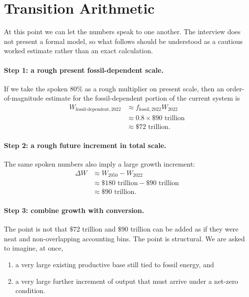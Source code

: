 \section{Transition Arithmetic}

At this point we can let the numbers speak to one another. The interview does not present a formal model, so what follows should be understood as a cautious worked estimate rather than an exact calculation.

\paragraph{Step 1: a rough present fossil-dependent scale.}

If we take the spoken \(80\%\) as a rough multiplier on present scale, then an order-of-magnitude estimate for the fossil-dependent portion of the current system is
\begin{align}
W_{\mathrm{fossil\text{-}dependent},2022}
&\approx f_{\mathrm{fossil},2022}W_{2022}\\
&\approx 0.8 \times \$90\text{ trillion}\\
&\approx \$72\text{ trillion}.
\end{align}

\paragraph{Step 2: a rough future increment in total scale.}

The same spoken numbers also imply a large growth increment:
\begin{align}
\Delta W
&\approx W_{2050} - W_{2022}\\
&\approx \$180\text{ trillion} - \$90\text{ trillion}\\
&\approx \$90\text{ trillion}.
\end{align}

\paragraph{Step 3: combine growth with conversion.}

The point is not that \(\$72\) trillion and \(\$90\) trillion can be added as if they were neat and non-overlapping accounting bins. The point is structural. We are asked to imagine, at once,
\begin{enumerate}
\item a very large existing productive base still tied to fossil energy, and
\item a very large further increment of output that must arrive under a net-zero condition.
\end{enumerate}

